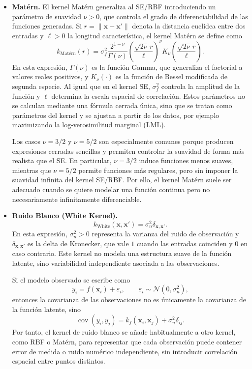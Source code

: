 \begin{itemize}
    \item \textbf{Matérn.}
    El kernel Matérn generaliza al SE/RBF introduciendo un parámetro de suavidad
    \(\nu>0\), que controla el grado de diferenciabilidad de las funciones generadas. Si
    \(r=\|\bm{x}-\bm{x}'\|\) denota la distancia euclídea entre dos entradas y \(\ell>0\) la
    longitud característica, el kernel Matérn se define como
    \begin{equation}
    k_{\text{Mat\'ern}}(r)=
    \sigma_f^2
    \frac{2^{1-\nu}}{\Gamma(\nu)}
    \left(\frac{\sqrt{2\nu}\, r}{\ell}\right)^\nu
    K_\nu\left(\frac{\sqrt{2\nu}\, r}{\ell}\right).
    \end{equation}
    En esta expresión, \(\Gamma(\nu)\) es la función Gamma, que generaliza el factorial a
    valores reales positivos, y \(K_\nu(\cdot)\) es la función de Bessel modificada de segunda
    especie. Al igual que en el kernel SE, \(\sigma_f^2\) controla la amplitud de la función y
    \(\ell\) determina la escala espacial de correlación. Estos parámetros no se calculan mediante
    una fórmula cerrada única, sino que se tratan como parámetros del kernel y se ajustan
    a partir de los datos, por ejemplo maximizando la log-verosimilitud marginal (LML).
    
    Los casos \(\nu=3/2\) y \(\nu=5/2\) son especialmente comunes porque producen expresiones
    cerradas sencillas y permiten controlar la suavidad de forma más realista que el SE. En
    particular, \(\nu=3/2\) induce funciones menos suaves, mientras que \(\nu=5/2\) permite
    funciones más regulares, pero sin imponer la suavidad infinita del kernel SE/RBF. Por ello,
    el kernel Matérn suele ser adecuado cuando se quiere modelar una función continua pero no
    necesariamente infinitamente diferenciable.

    \item \textbf{Ruido Blanco (White Kernel).}
    \[
    k_{\mathrm{White}}(\bm{x},\bm{x}')
    =
    \sigma_n^2 \delta_{\bm{x},\bm{x}'}.
    \]
    En esta expresión, \(\sigma_n^2>0\) representa la varianza del ruido de observación y
    \(\delta_{\bm{x},\bm{x}'}\) es la delta de Kronecker, que vale \(1\) cuando las entradas
    coinciden y \(0\) en caso contrario. Este kernel no modela una estructura suave de la
    función latente, sino variabilidad independiente asociada a las observaciones.

    Si el modelo observado se escribe como
    \[
    y_i = f(\bm{x}_i)+\varepsilon_i,
    \qquad
    \varepsilon_i\sim\mathcal{N}(0,\sigma_n^2),
    \]
    entonces la covarianza de las observaciones no es únicamente la covarianza de la función
    latente, sino
    \[
    \operatorname{cov}(y_i,y_j)
    =
    k_f(\bm{x}_i,\bm{x}_j)
    +
    \sigma_n^2\delta_{ij}.
    \]
    Por tanto, el kernel de ruido blanco se añade habitualmente a otro kernel, como RBF o
    Matérn, para representar que cada observación puede contener error de medida o ruido
    numérico independiente, sin introducir correlación espacial entre puntos distintos.

\end{itemize}
